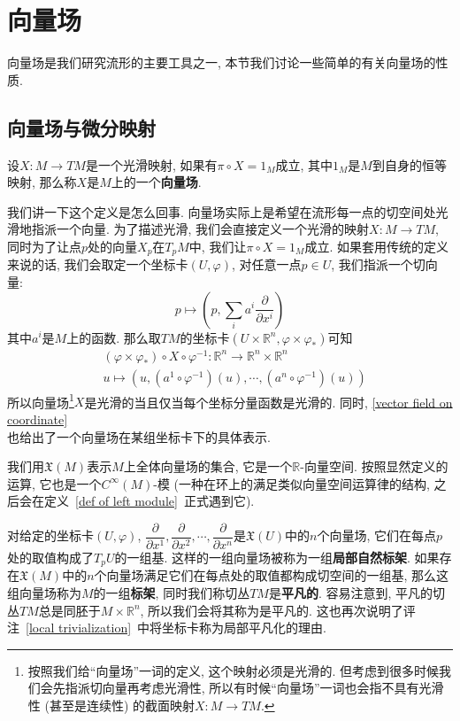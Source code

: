 \section{向量场}
向量场是我们研究流形的主要工具之一, 本节我们讨论一些简单的有关向量场的性质.

\subsection*{向量场与微分映射}
\begin{defn}
    设$X:M\to TM$是一个光滑映射, 如果有$\pi\circ X=1_M$成立, 其中$1_M$是$M$到自身的恒等映射, 那么称$X$是$M$上的一个\textbf{向量场}.
\end{defn}
\begin{rem}
    我们讲一下这个定义是怎么回事.
    向量场实际上是希望在流形每一点的切空间处光滑地指派一个向量.
    为了描述光滑, 我们会直接定义一个光滑的映射$X:M\to TM$, 同时为了让点$p$处的向量$X_p$在$T_pM$中, 我们让$\pi\circ X=1_M$成立.
    如果套用传统的定义来说的话, 我们会取定一个坐标卡$(U,\varphi)$, 对任意一点$p\in U$, 我们指派一个切向量:
    \begin{equation}
        p\mapsto\left(p,\sum_{i}a^i\frac{\partial}{\partial x^i}\right)\label{vector field on coordinate}
    \end{equation}
    其中$a^i$是$M$上的函数.
    那么取$TM$的坐标卡$(U\times\mathbb{R}^n,\varphi\times\varphi_*)$可知
    \begin{align*}
        &(\varphi\times\varphi_*)\circ X\circ\varphi^{-1}:\mathbb{R}^n\to\mathbb{R}^n\times\mathbb{R}^n\\
        &u\mapsto\left(u,(a^1\circ\varphi^{-1})(u),\cdots,(a^n\circ\varphi^{-1})(u)\right)
    \end{align*}
    所以向量场\footnote{按照我们给``向量场''一词的定义, 这个映射必须是光滑的. 但考虑到很多时候我们会先指派切向量再考虑光滑性, 所以有时候``向量场''一词也会指不具有光滑性 (甚至是连续性) 的截面映射$X:M\to TM$.}$X$是光滑的当且仅当每个坐标分量函数是光滑的.
    同时, \eqref{vector field on coordinate}\\也给出了一个向量场在某组坐标卡下的具体表示.
\end{rem}
\begin{sym}
    我们用$\mathfrak{X}(M)$表示$M$上全体向量场的集合, 它是一个$\mathbb{R}$-向量空间.
    按照显然定义的运算, 它也是一个$C^\infty(M)$-模 (一种在环上的满足类似向量空间运算律的结构, 之后会在定义~\ref{def of left module}~正式遇到它).
\end{sym}
\begin{eg}
    对给定的坐标卡$(U,\varphi)$, $\dfrac{\partial}{\partial x^1},\dfrac{\partial}{\partial x^2},\cdots,\dfrac{\partial}{\partial x^n}$是$\mathfrak{X}(U)$中的$n$个向量场, 它们在每点$p$处的取值构成了$T_pU$的一组基.
    这样的一组向量场被称为一组\textbf{局部自然标架}.
    如果存在$\mathfrak{X}(M)$中的$n$个向量场满足它们在每点处的取值都构成切空间的一组基, 那么这组向量场称为$M$的一组\textbf{标架}, 同时我们称切丛$TM$是\textbf{平凡的}.
    容易注意到, 平凡的切丛$TM$总是同胚于$M\times\mathbb{R}^n$, 所以我们会将其称为是平凡的.
    这也再次说明了评注~\ref{local trivialization}~中将坐标卡称为局部平凡化的理由.
\end{eg}

